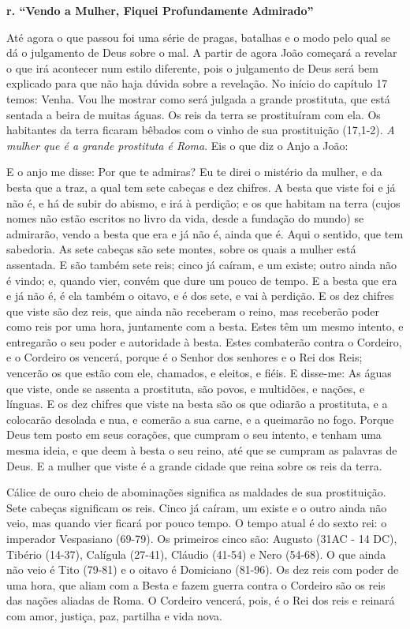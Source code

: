 \documentclass[
]{book}
\begin{document}
\textbf{r. ``Vendo a Mulher, Fiquei Profundamente Admirado''}

Até agora o que passou foi uma série de pragas, batalhas e o modo pelo qual se dá o julgamento de Deus sobre o mal. A partir de agora João começará a revelar o que irá acontecer num estilo diferente, pois o julgamento de Deus será bem explicado para que não haja dúvida sobre a revelação. No início do capítulo 17 temos: Venha. Vou lhe mostrar como será julgada a grande prostituta, que está sentada a beira de muitas águas. Os reis da terra se prostituíram com ela. Os habitantes da terra ficaram bêbados com o vinho de sua prostituição (17,1-2). \emph{A mulher que é a grande prostituta é Roma}. Eis o que diz o Anjo a João:

E o anjo me disse: Por que te admiras? Eu te direi o mistério da mulher, e da besta que a traz, a qual tem sete cabeças e dez chifres. A besta que viste foi e já não é, e há de subir do abismo, e irá à perdição; e os que habitam na terra (cujos nomes não estão escritos no livro da vida, desde a fundação do mundo) se admirarão, vendo a besta que era e já não é, ainda que é. Aqui o sentido, que tem sabedoria. As sete cabeças são sete montes, sobre os quais a mulher está assentada. E são também sete reis; cinco já caíram, e um existe; outro ainda não é vindo; e, quando vier, convém que dure um pouco de tempo. E a besta que era e já não é, é ela também o oitavo, e é dos sete, e vai à perdição. E os dez chifres que viste são dez reis, que ainda não receberam o reino, mas receberão poder como reis por uma hora, juntamente com a besta. Estes têm um mesmo intento, e entregarão o seu poder e autoridade à besta. Estes combaterão contra o Cordeiro, e o Cordeiro os vencerá, porque é o Senhor dos senhores e o Rei dos Reis; vencerão os que estão com ele, chamados, e eleitos, e fiéis. E disse-me: As águas que viste, onde se assenta a prostituta, são povos, e multidões, e nações, e línguas. E os dez chifres que viste na besta são os que odiarão a prostituta, e a colocarão desolada e nua, e comerão a sua carne, e a queimarão no fogo. Porque Deus tem posto em seus corações, que cumpram o seu intento, e tenham uma mesma ideia, e que deem à besta o seu reino, até que se cumpram as palavras de Deus. E a mulher que viste é a grande cidade que reina sobre os reis da terra.

Cálice de ouro cheio de abominações significa as maldades de sua prostituição. Sete cabeças significam os reis. Cinco já caíram, um existe e o outro ainda não veio, mas quando vier ficará por pouco tempo. O tempo atual é do sexto rei: o imperador Vespasiano (69-79). Os primeiros cinco são: Augusto (31AC - 14 DC), Tibério (14-37), Calígula (27-41), Cláudio (41-54) e Nero (54-68). O que ainda não veio é Tito (79-81) e o oitavo é Domiciano (81-96). Os dez reis com poder de uma hora, que aliam com a Besta e fazem guerra contra o Cordeiro são os reis das nações aliadas de Roma. O Cordeiro vencerá, pois, é o Rei dos reis e reinará com amor, justiça, paz, partilha e vida nova.
\end{document}
